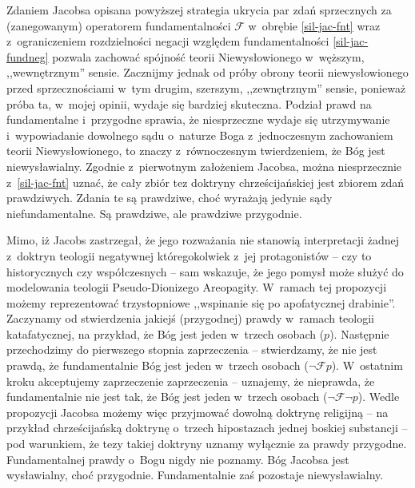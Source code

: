 Zdaniem Jacobsa opisana powyższej strategia ukrycia par zdań sprzecznych za (zanegowanym) operatorem fundamentalności $\mathscr{F}$ w~obrębie \ref{sil-jac-fnt} wraz z~ograniczeniem rozdzielności negacji względem fundamentalności \eqref{sil-jac-fundneg} pozwala zachować spójność teorii Niewysłowionego w~węższym, ,,wewnętrznym'' sensie. Zacznijmy jednak od próby obrony teorii niewysłowionego przed sprzecznościami w~tym drugim, szerszym, ,,zewnętrznym'' sensie, ponieważ próba ta, w~mojej opinii, wydaje się bardziej skuteczna. Podział prawd na fundamentalne i~przygodne sprawia, że niesprzeczne wydaje się utrzymywanie i~wypowiadanie dowolnego sądu o~naturze Boga z~jednoczesnym zachowaniem teorii Niewysłowionego, to znaczy z~równoczesnym twierdzeniem, że Bóg jest niewysławialny. Zgodnie z~pierwotnym założeniem Jacobsa, można niesprzecznie z~\ref{sil-jac-fnt} uznać, że cały zbiór tez doktryny chrześcijańskiej jest zbiorem zdań prawdziwych. Zdania te są prawdziwe, choć wyrażają jedynie sądy niefundamentalne. Są prawdziwe, ale prawdziwe przygodnie.

Mimo, iż Jacobs zastrzegał, że jego rozważania nie stanowią interpretacji żadnej z~doktryn teologii negatywnej któregokolwiek z~jej protagonistów -- czy to historycznych czy współczesnych -- sam wskazuje, że jego pomysł może służyć do modelowania teologii Pseudo-Dionizego Areopagity. W~ramach tej propozycji możemy reprezentować trzystopniowe ,,wspinanie się po apofatycznej drabinie''. Zaczynamy od stwierdzenia jakiejś (przygodnej) prawdy w~ramach teologii katafatycznej, na przykład, że Bóg jest jeden w~trzech osobach ($p$). Następnie przechodzimy do pierwszego stopnia zaprzeczenia -- stwierdzamy, że nie jest prawdą, że fundamentalnie Bóg jest jeden w~trzech osobach ($\neg \mathscr{F}p$). W~ostatnim kroku akceptujemy zaprzeczenie zaprzeczenia -- uznajemy, że nieprawda, że fundamentalnie nie jest tak, że Bóg jest jeden w~trzech osobach ($\neg \mathscr{F} \neg p$). Wedle propozycji Jacobsa możemy więc przyjmować dowolną doktrynę religijną -- na przykład chrześcijańską doktrynę o~trzech hipostazach jednej boskiej substancji -- pod warunkiem, że tezy takiej doktryny uznamy wyłącznie za prawdy przygodne. Fundamentalnej prawdy o~Bogu nigdy nie poznamy. Bóg Jacobsa jest wysławialny, choć przygodnie. Fundamentalnie zaś pozostaje niewysławialny.

